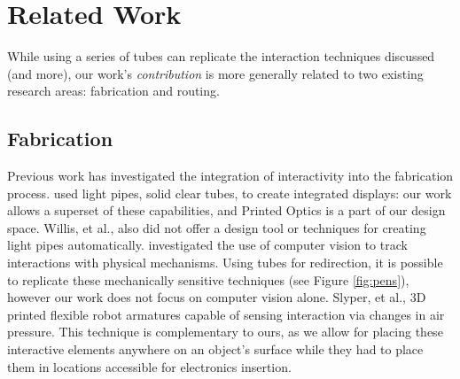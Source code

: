 \section{Related Work}

While using a series of tubes can replicate the interaction techniques discussed (and more), our work's \emph{contribution} is more generally related to two existing research areas: fabrication and routing.

\subsection{Fabrication}

Previous work has investigated the integration of interactivity into the fabrication process.  \cite{Willis-printedoptics} used light pipes, solid clear tubes, to create integrated displays: our work allows a superset of these capabilities, and Printed Optics is a part of our design space.  Willis, et al., also did not offer a design tool or techniques for creating light pipes automatically.  \cite{Savage-sauron} investigated the use of computer vision to track interactions with physical mechanisms.  Using tubes for redirection, it is possible to replicate these mechanically sensitive techniques (see Figure \ref{fig:pens}), however our work does not focus on computer vision alone.  Slyper, et al., \cite{Slyper-pressure} 3D printed flexible robot armatures capable of sensing interaction via changes in air pressure.  This technique is complementary to ours, as we allow for placing these interactive elements anywhere on an object's surface while they had to place them in locations accessible for electronics insertion.

